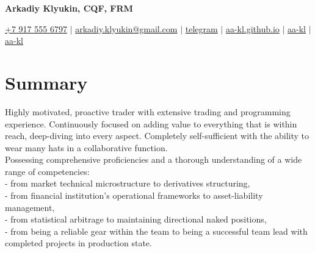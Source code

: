 \documentclass[a4paper,hidelinks]{article}
\begin{document}

\begin{center}
  \textbf{\Huge{Arkadiy Klyukin, CQF, FRM}} \\ \vspace{4pt}
  
  \small
  \faMobile* \hspace{.5pt} \href{tel:+79175556797}{+7 917 555 6797}
  $|$
  \faAt \hspace{.5pt} \href{mailto:arkadiy.klyukin@gmail.com}{arkadiy.klyukin@gmail.com}
  $|$
  \faTelegramPlane \hspace{.5pt} \href{https://t.me/aa_tgm}{telegram}
  $|$
  \faGlobeAmericas \hspace{.5pt} \href{https://aa-kl.github.io}{aa-kl.github.io}
  $|$
  \faLinkedinIn \hspace{.5pt} \href{https://www.linkedin.com/in/aa-kl}{aa-kl}
  $|$
  \faGithub \hspace{.5pt} \href{https://github.com/aa-kl}{aa-kl}
\end{center}

\vspace{-12pt}
\section{Summary}
Highly motivated, proactive trader with extensive trading and programming experience. Continuously focused on adding value to everything that is within reach, deep-diving into every aspect. Completely self-sufficient with the ability to wear many hats in a collaborative function.\\
Possessing comprehensive proficiencies and a thorough understanding of a wide range of competencies:\\
- from market technical microstructure to derivatives structuring,\\
- from financial institution's operational frameworks to asset-liability management,\\
- from statistical arbitrage to maintaining directional naked positions,\\
- from being a reliable gear within the team to being a successful team lead with completed projects in production state.\\
\end{document}
